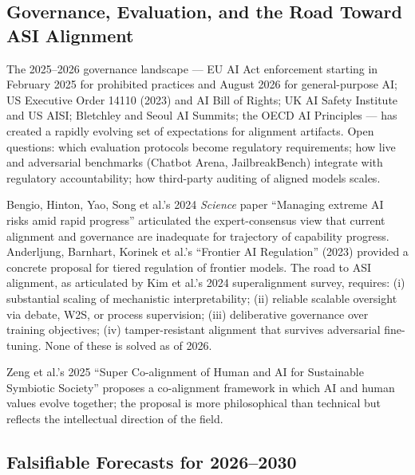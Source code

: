 \subsection{Governance, Evaluation, and the Road Toward ASI Alignment}\label{governance-evaluation-and-the-road-toward-asi-alignment}

The 2025--2026 governance landscape --- EU AI Act enforcement starting in February 2025 for prohibited practices and August 2026 for general-purpose AI; US Executive Order 14110 (2023) and AI Bill of Rights; UK AI Safety Institute and US AISI; Bletchley and Seoul AI Summits; the OECD AI Principles --- has created a rapidly evolving set of expectations for alignment artifacts. Open questions: which evaluation protocols become regulatory requirements; how live and adversarial benchmarks (Chatbot Arena, JailbreakBench) integrate with regulatory accountability; how third-party auditing of aligned models scales.

Bengio, Hinton, Yao, Song et al.'s 2024 \emph{Science} paper ``Managing extreme AI risks amid rapid progress'' articulated the expert-consensus view that current alignment and governance are inadequate for trajectory of capability progress. Anderljung, Barnhart, Korinek et al.'s ``Frontier AI Regulation'' (2023) provided a concrete proposal for tiered regulation of frontier models. The road to ASI alignment, as articulated by Kim et al.'s 2024 superalignment survey, requires: (i) substantial scaling of mechanistic interpretability; (ii) reliable scalable oversight via debate, W2S, or process supervision; (iii) deliberative governance over training objectives; (iv) tamper-resistant alignment that survives adversarial fine-tuning. None of these is solved as of 2026.

Zeng et al.'s 2025 ``Super Co-alignment of Human and AI for Sustainable Symbiotic Society'' proposes a co-alignment framework in which AI and human values evolve together; the proposal is more philosophical than technical but reflects the intellectual direction of the field.

\subsection{Falsifiable Forecasts for 2026--2030}\label{falsifiable-forecasts-for-20262030}

